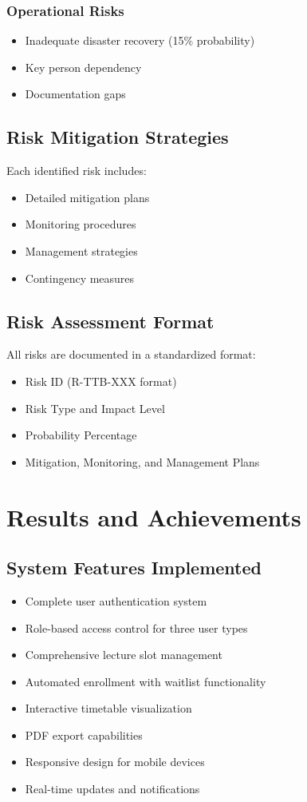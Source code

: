 \documentclass[12pt,a4paper]{report}
\begin{document}
\subsection{Operational Risks}
\begin{itemize}[leftmargin=*]
    \item Inadequate disaster recovery (15\% probability)
    \item Key person dependency
    \item Documentation gaps
\end{itemize}

\section{Risk Mitigation Strategies}
Each identified risk includes:
\begin{itemize}[leftmargin=*]
    \item Detailed mitigation plans
    \item Monitoring procedures
    \item Management strategies
    \item Contingency measures
\end{itemize}

\section{Risk Assessment Format}
All risks are documented in a standardized format:
\begin{itemize}[leftmargin=*]
    \item Risk ID (R-TTB-XXX format)
    \item Risk Type and Impact Level
    \item Probability Percentage
    \item Mitigation, Monitoring, and Management Plans
\end{itemize}

\chapter{Results and Achievements}

\section{System Features Implemented}
\begin{itemize}[leftmargin=*]
    \item Complete user authentication system
    \item Role-based access control for three user types
    \item Comprehensive lecture slot management
    \item Automated enrollment with waitlist functionality
    \item Interactive timetable visualization
    \item PDF export capabilities
    \item Responsive design for mobile devices
    \item Real-time updates and notifications
\end{itemize}
\end{document}
